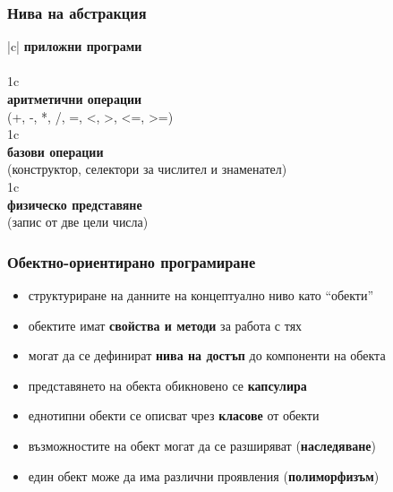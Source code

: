 \documentclass[alsotrans]{beamerswitch}
\begin{document}
\begin{frame}
  \frametitle{Нива на абстракция}

  \renewcommand{\bua}{\bigg\uparrow}

  \begin{center}
    \begin{tabular}{|c|}
      \hline
      \textbf{приложни програми}\\
      \\
      \hline
      \multicolumn 1c\bua\\
      \hline
      \textbf{аритметични операции}\\
      (+, -, *, /, =, <, >, <=, >=)\\
      \hline
      \multicolumn 1c\bua\\
      \hline
      \textbf{базови операции}\\
      (конструктор, селектори за числител и знаменател)\\
      \hline
      \multicolumn 1c\bua\\
      \hline
      \textbf{физическо представяне}\\
      (запис от две цели числа)\\
      \hline
    \end{tabular}
  \end{center}
\end{frame}

\begin{frame}
  \frametitle{Обектно-ориентирано програмиране}

  \begin{itemize}
  \item структуриране на данните на концептуално ниво като ``обекти''
  \item обектите имат \textbf{свойства и методи} за работа с тях
  \item могат да се дефинират \textbf{нива на достъп} до компоненти на обекта
  \item представянето на обекта обикновено се \textbf{капсулира}
  \item еднотипни обекти се описват чрез \textbf{класове} от обекти
  \item възможностите на обект могат да се разширяват (\textbf{наследяване})
  \item един обект може да има различни проявления (\textbf{полиморфизъм})
  \end{itemize}
\end{frame}
\end{document}
